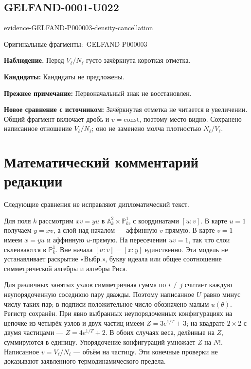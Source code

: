 \documentclass[11pt]{article}
\newcommand{\EvidenceBlock}[4]{%
 \par\smallskip\noindent\begin{minipage}{\linewidth}
 \begin{minipage}[t]{.47\linewidth}\vspace{0pt}\centering
 \csname evidence-#1-#2\endcsname\par
 {\scriptsize\SourceCropCaption\ #1}\par
 \end{minipage}\hfill
 \begin{minipage}[t]{.49\linewidth}\vspace{0pt}\raggedright
 {\small\color{orange!65!black}\textbf{#4} #3}\par
 \end{minipage}
 \end{minipage}\par\smallskip}
\newcommand{\SourceCropCaption}{Оригинальные фрагменты:}\newcommand{\ReadingCaption}{Сомнительное чтение.}\newcommand{\IncompleteCaption}{Неразобранный фрагмент.}\newcommand{\DiagramCaption}{Рисунок и набранное описание.}
\begin{document}
\subsection*{GELFAND-0001-U022}
\EvidenceBlock{GELFAND-P000003}{density-cancellation}{Перед \(V_\ell/N_\ell\) густо зачёркнута короткая отметка.}{Наблюдение.}
\par\smallskip\noindent\textbf{Кандидаты: } Кандидаты не предложены.\par
\par\smallskip\noindent\textbf{Прежнее примечание: } Первоначальный знак не восстановлен.\par
\par\smallskip\noindent\textbf{Новое сравнение с источником: } Зачёркнутая отметка не читается в увеличении. Общий фрагмент включает дробь и \(v=\mathrm{const}\), поэтому место видно. Сохранено написанное отношение \(V_\ell/N_\ell\); оно не заменено молча плотностью \(N_\ell/V_\ell\).\par

\clearpage\section*{Математический комментарий редакции}
Следующие сравнения не исправляют дипломатический текст.

Для поля \(k\) рассмотрим \(xv=yu\) в \(\mathbb A^2_k\times\mathbb P^1_k\), с координатами \([u:v]\). В карте \(u=1\) получаем \(y=xv\), а слой над началом — аффинную \(v\)-прямую. В карте \(v=1\) имеем \(x=yu\) и аффинную \(u\)-прямую. На пересечении \(uv=1\), так что слои склеиваются в \(\mathbb P^1_k\). Вне начала \([u:v]=[x:y]\) единственно. Эта модель не устанавливает раскрытие «Выбр.», букву идеала или общее соотношение симметрической алгебры и алгебры Риса.

Для различных занятых узлов симметричная сумма по \(i\ne j\) считает каждую неупорядоченную соседнюю пару дважды. Поэтому написанное \(U\) равно минус числу таких пар; в подписи положительное число обозначено малым \(u(\theta)\). Регистр сохранён. При явно выбранных неупорядоченных конфигурациях на цепочке из четырёх узлов и двух частиц имеем \(Z=3e^{1/T}+3\); на квадрате \(2\times2\) с двумя частицами — \(Z=4e^{1/T}+2\). В обоих случаях веса, делённые на \(Z\), суммируются в единицу. Упорядочение конфигураций умножает \(Z\) на \(N!\). Написанное \(v=V_\ell/N_\ell\) — объём на частицу. Эти конечные проверки не доказывают заявленного термодинамического предела.
\end{document}
